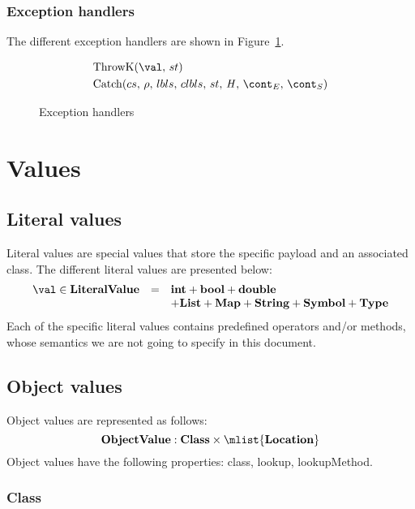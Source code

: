 \documentclass{article}
\begin{document}
\subsubsection{Exception handlers}
\label{subsubsec:exception-handlers}
The different exception handlers are shown in Figure~\ref{figure:handlers}.
\newcommand{\ThrowH}[2]{\mathrm{ThrowK}({#1},\,{#2})}
\newcommand{\CatchH}[1]{\mathrm{Catch}({#1},\,\env,\,\lbls,\,\clbls,\,\strace,\,\handler,\,\econt,\,\scont)}

\begin{figure}[Htp]
  \begin{align}
    &\ThrowH{\val}{\strace} \label{handle:throw} \\
    &\CatchH{cs} \label{handle:catch}
  \end{align}
  \caption{Exception handlers}
  \label{figure:handlers}
\end{figure}

\section{Values}
\label{sec:values}
\subsection{Literal values}
\label{subsubsec:literal-values}
Literal values are special values that store the specific payload and an associated class.
The different literal values are presented below: 
\[
  \begin{array}{lcl}
	\val \in \dlitval &=& \mathbf{int} + \mathbf{bool} + \mathbf{double}\\
	&& + \mathbf{List} + \mathbf{Map} + \mathbf{String} + \mathbf{Symbol} + \mathbf{Type}
  \end{array}
\]
Each of the specific literal values contains predefined operators and/or methods, whose semantics we are not going to specify in this document.
\subsection{Object values}
\label{subsec:object-values}
Object values are represented as follows:
\[
	\dobjval : \dclass \times \mlist{\dlocation}\\
\]
Object values have the following properties: class, lookup, lookupMethod. %
\subsubsection{Class}
\label{subsubsec:class}
\end{document}
